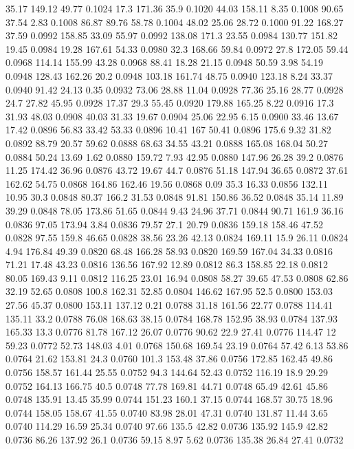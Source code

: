 35.17	149.12	49.77	0.1024
17.3	171.36	35.9	0.1020
44.03	158.11	8.35	0.1008
90.65	37.54	2.83	0.1008
86.87	89.76	58.78	0.1004
48.02	25.06	28.72	0.1000
91.22	168.27	37.59	0.0992
158.85	33.09	55.97	0.0992
138.08	171.3	23.55	0.0984
130.77	151.82	19.45	0.0984
19.28	167.61	54.33	0.0980
32.3	168.66	59.84	0.0972
27.8	172.05	59.44	0.0968
114.14	155.99	43.28	0.0968
88.41	18.28	21.15	0.0948
50.59	3.98	54.19	0.0948
128.43	162.26	20.2	0.0948
103.18	161.74	48.75	0.0940
123.18	8.24	33.37	0.0940
91.42	24.13	0.35	0.0932
73.06	28.88	11.04	0.0928
77.36	25.16	28.77	0.0928
24.7	27.82	45.95	0.0928
17.37	29.3	55.45	0.0920
179.88	165.25	8.22	0.0916
17.3	31.93	48.03	0.0908
40.03	31.33	19.67	0.0904
25.06	22.95	6.15	0.0900
33.46	13.67	17.42	0.0896
56.83	33.42	53.33	0.0896
10.41	167	50.41	0.0896
175.6	9.32	31.82	0.0892
88.79	20.57	59.62	0.0888
68.63	34.55	43.21	0.0888
165.08	168.04	50.27	0.0884
50.24	13.69	1.62	0.0880
159.72	7.93	42.95	0.0880
147.96	26.28	39.2	0.0876
11.25	174.42	36.96	0.0876
43.72	19.67	44.7	0.0876
51.18	147.94	36.65	0.0872
37.61	162.62	54.75	0.0868
164.86	162.46	19.56	0.0868
0.09	35.3	16.33	0.0856
132.11	10.95	30.3	0.0848
80.37	166.2	31.53	0.0848
91.81	150.86	36.52	0.0848
35.14	11.89	39.29	0.0848
78.05	173.86	51.65	0.0844
9.43	24.96	37.71	0.0844
90.71	161.9	36.16	0.0836
97.05	173.94	3.84	0.0836
79.57	27.1	20.79	0.0836
159.18	158.46	47.52	0.0828
97.55	159.8	46.65	0.0828
38.56	23.26	42.13	0.0824
169.11	15.9	26.11	0.0824
4.94	176.84	49.39	0.0820
68.48	166.28	58.93	0.0820
169.59	167.04	34.33	0.0816
71.21	17.48	43.23	0.0816
136.56	167.92	12.89	0.0812
86.3	158.85	22.18	0.0812
80.05	169.43	9.11	0.0812
116.25	23.01	16.94	0.0808
58.27	39.65	47.53	0.0808
62.86	32.19	52.65	0.0808
100.8	162.31	52.85	0.0804
146.62	167.95	52.5	0.0800
153.03	27.56	45.37	0.0800
153.11	137.12	0.21	0.0788
31.18	161.56	22.77	0.0788
114.41	135.11	33.2	0.0788
76.08	168.63	38.15	0.0784
168.78	152.95	38.93	0.0784
137.93	165.33	13.3	0.0776
81.78	167.12	26.07	0.0776
90.62	22.9	27.41	0.0776
114.47	12	59.23	0.0772
52.73	148.03	4.01	0.0768
150.68	169.54	23.19	0.0764
57.42	6.13	53.86	0.0764
21.62	153.81	24.3	0.0760
101.3	153.48	37.86	0.0756
172.85	162.45	49.86	0.0756
158.57	161.44	25.55	0.0752
94.3	144.64	52.43	0.0752
116.19	18.9	29.29	0.0752
164.13	166.75	40.5	0.0748
77.78	169.81	44.71	0.0748
65.49	42.61	45.86	0.0748
135.91	13.45	35.99	0.0744
151.23	160.1	37.15	0.0744
168.57	30.75	18.96	0.0744
158.05	158.67	41.55	0.0740
83.98	28.01	47.31	0.0740
131.87	11.44	3.65	0.0740
114.29	16.59	25.34	0.0740
97.66	135.5	42.82	0.0736
135.92	145.9	42.82	0.0736
86.26	137.92	26.1	0.0736
59.15	8.97	5.62	0.0736
135.38	26.84	27.41	0.0732
